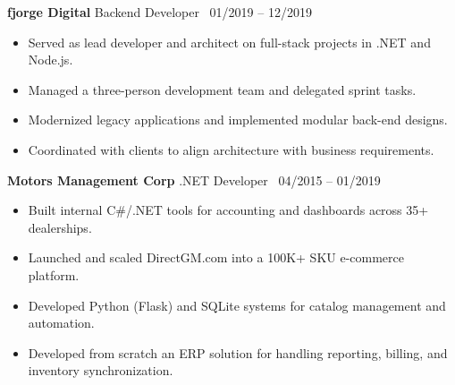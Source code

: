 \documentclass[11pt]{article}
\begin{document}
\textbf{fjorge Digital} \hfill Backend Developer \textbar\ 01/2019 -- 12/2019
\begin{itemize}[label=--]
\item Served as lead developer and architect on full-stack projects in .NET and Node.js.
\item Managed a three-person development team and delegated sprint tasks.
\item Modernized legacy applications and implemented modular back-end designs.
\item Coordinated with clients to align architecture with business requirements. \\
\end{itemize}
\textbf{Motors Management Corp} \hfill .NET Developer \textbar\ 04/2015 -- 01/2019
\begin{itemize}[label=--]
\item Built internal C\#/.NET tools for accounting and dashboards across 35+ dealerships.
\item Launched and scaled DirectGM.com into a 100K+ SKU e-commerce platform.
\item Developed Python (Flask) and SQLite systems for catalog management and automation.
\item Developed from scratch an ERP solution for handling reporting, billing, and inventory synchronization.
\end{itemize}
\end{document}

